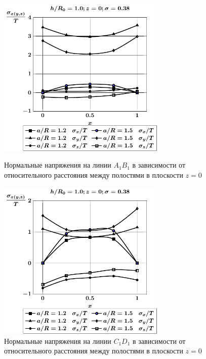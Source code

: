 \begin{figure}[h!]
\centering\footnotesize
\parbox[b]{7.5cm}{\centering\includegraphics[width=8cm]{cav24-a-h10-r10-z0-a1b1.pdf}
\caption{Нормальные напряжения на линии $A_1B_1$ в зависимости от относительного расстояния между полостями в плоскости $z=0$
\label{f:7:130}}}\hfil\hfil
\parbox[b]{7.5cm}{\centering\includegraphics[width=8cm]{cav24-a-h10-r10-z0-c1d1.pdf}
\caption{Нормальные напряжения на линии $C_1D_1$ в зависимости от относительного расстояния между полостями в плоскости $z=0$
\label{f:7:131}}}
\end{figure}

